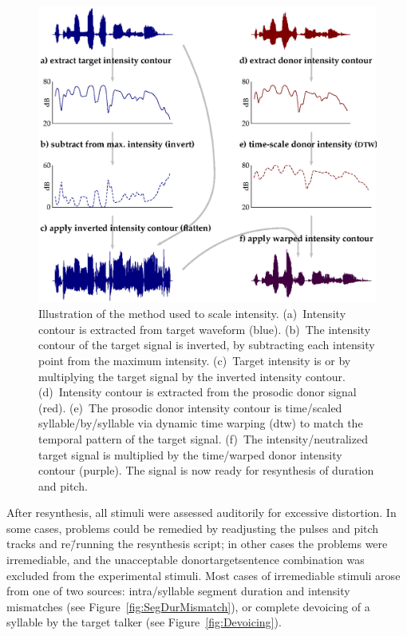 \begin{figure}
	\begin{centering}
	\includegraphics{figures/intensity/intensity2.eps}
	\caption[Intensity scaling in resynthesis]{Illustration of the method used to scale intensity.  (a)~Intensity contour is extracted from target waveform (blue).  (b)~The intensity contour of the target signal is inverted, by subtracting each intensity point from the maximum intensity.  (c)~Target intensity is  or  by multiplying the target signal by the inverted intensity contour.  (d)~Intensity contour is extracted from the prosodic donor signal (red).  (e)~The prosodic donor intensity contour is time\-/scaled syllable\-/by\-/syllable via dynamic time warping (\ac{dtw}) to match the temporal pattern of the target signal.  (f)~The intensity\-/neutralized target signal is multiplied by the time\-/warped donor intensity contour (purple).  The signal is now ready for \psola{} resynthesis of duration and pitch.\label{fig:IntenManip}}
	\end{centering}
\end{figure}

After resynthesis, all stimuli were assessed auditorily for excessive distortion.  In some cases, problems could be remedied by readjusting the pulses and pitch tracks and re\=/running the resynthesis script; in other cases the problems were irremediable, and the unacceptable donor\slsh{}target\slsh{}sentence combination was excluded from the experimental stimuli.  Most cases of irremediable stimuli arose from one of two sources: intra\-/syllable segment duration and intensity mismatches (see Figure~\ref{fig:SegDurMismatch}), or complete devoicing of a syllable by the target talker (see Figure~\ref{fig:Devoicing}).

